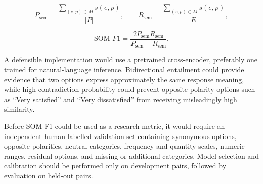 \documentclass[11pt,a4paper]{article}
\begin{document}
\[
P_{\mathrm{sem}}
=
\frac{\sum_{(e,p)\in M}s(e,p)}{|P|},
\qquad
R_{\mathrm{sem}}
=
\frac{\sum_{(e,p)\in M}s(e,p)}{|E|},
\]

\[
\mathrm{SOM}\text{-}F1
=
\frac{2P_{\mathrm{sem}}R_{\mathrm{sem}}}
     {P_{\mathrm{sem}}+R_{\mathrm{sem}}}.
\]

A defensible implementation would use a
pretrained cross-encoder, preferably one trained for natural-language
inference. Bidirectional entailment could provide evidence that two options
express approximately the same response meaning, while high contradiction
probability could prevent opposite-polarity options such as ``Very satisfied''
and ``Very dissatisfied'' from receiving misleadingly high similarity.

Before SOM-F1 could be used as a research metric, it would require an
independent human-labelled validation set containing synonymous options,
opposite polarities, neutral categories, frequency and quantity scales, numeric
ranges, residual options, and missing or additional categories. Model selection
and calibration should be performed only on development pairs, followed by
evaluation on held-out pairs.
\end{document}
